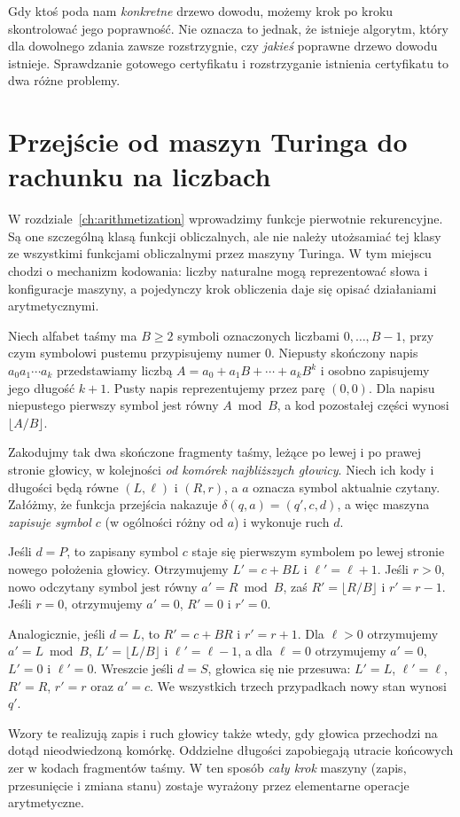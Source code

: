 \begin{przyklad}
Gdy ktoś poda nam \emph{konkretne} drzewo dowodu,
możemy krok po kroku skontrolować jego poprawność.
Nie oznacza to jednak, że istnieje algorytm,
który dla dowolnego zdania zawsze rozstrzygnie,
czy \emph{jakieś} poprawne drzewo dowodu istnieje.
Sprawdzanie gotowego certyfikatu i rozstrzyganie
istnienia certyfikatu to dwa różne problemy.
\end{przyklad}


\section{Przejście od maszyn Turinga do rachunku na liczbach}
W rozdziale~\ref{ch:arithmetization} wprowadzimy funkcje
pierwotnie rekurencyjne. Są one szczególną klasą funkcji
obliczalnych, ale nie należy utożsamiać tej klasy ze wszystkimi
funkcjami obliczalnymi przez maszyny Turinga.
W tym miejscu chodzi o mechanizm kodowania: liczby naturalne
mogą reprezentować słowa i konfiguracje maszyny, a pojedynczy
krok obliczenia daje się opisać działaniami arytmetycznymi.

\begin{przyklad}
Niech alfabet taśmy ma $B\geqslant 2$ symboli oznaczonych
liczbami $0,\ldots,B-1$, przy czym symbolowi pustemu
przypisujemy numer $0$. Niepusty skończony napis
$a_0a_1\cdots a_k$ przedstawiamy liczbą
$A=a_0+a_1B+\cdots+a_kB^k$ i osobno zapisujemy jego
długość $k+1$. Pusty napis reprezentujemy przez parę $(0,0)$.
Dla napisu niepustego pierwszy symbol jest równy $A\bmod B$,
a kod pozostałej części wynosi $\lfloor A/B\rfloor$.

Zakodujmy tak dwa skończone fragmenty taśmy, leżące po lewej
i po prawej stronie głowicy, w kolejności \emph{od komórek
najbliższych głowicy}. Niech ich kody i długości będą równe
$(L,\ell)$ i $(R,r)$, a $a$ oznacza symbol aktualnie czytany.
Załóżmy, że funkcja przejścia nakazuje
$\delta(q,a)=(q',c,d)$, a więc maszyna \emph{zapisuje symbol $c$}
(w ogólności różny od $a$) i wykonuje ruch $d$.

Jeśli $d=P$, to zapisany symbol $c$ staje się pierwszym
symbolem po lewej stronie nowego położenia głowicy.
Otrzymujemy $L'=c+BL$ i $\ell'=\ell+1$.
Jeśli $r>0$, nowo odczytany symbol jest równy
$a'=R\bmod B$, zaś $R'=\lfloor R/B\rfloor$ i $r'=r-1$.
Jeśli $r=0$, otrzymujemy $a'=0$, $R'=0$ i $r'=0$.

Analogicznie, jeśli $d=L$, to $R'=c+BR$ i $r'=r+1$.
Dla $\ell>0$ otrzymujemy $a'=L\bmod B$,
$L'=\lfloor L/B\rfloor$ i $\ell'=\ell-1$,
a dla $\ell=0$ otrzymujemy $a'=0$, $L'=0$ i $\ell'=0$.
Wreszcie jeśli $d=S$, głowica się nie przesuwa:
$L'=L$, $\ell'=\ell$, $R'=R$, $r'=r$ oraz $a'=c$.
We wszystkich trzech przypadkach nowy stan wynosi $q'$.

Wzory te realizują zapis i ruch głowicy także wtedy,
gdy głowica przechodzi na dotąd nieodwiedzoną komórkę.
Oddzielne długości zapobiegają utracie końcowych zer
w kodach fragmentów taśmy. W ten sposób \emph{cały krok}
maszyny (zapis, przesunięcie i zmiana stanu) zostaje wyrażony
przez elementarne operacje arytmetyczne.
\end{przyklad}

